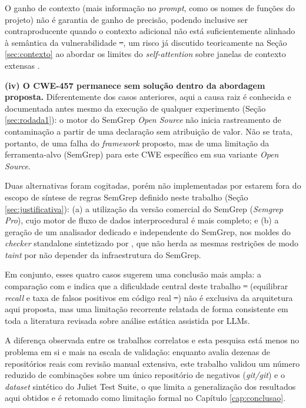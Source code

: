 \documentclass[
    12pt,                %
    openright,           %
    oneside,             %
    a4paper,             %
    english,             %
    brazil               %
]{abntex2}
\newcommand{\antigo}[1]{\sout{#1}}
\newcommand{\novo}[1]{{\color{red}#1}}
\begin{document}
O ganho de contexto (mais informação no \textit{prompt}, como os nomes de funções do projeto) não é garantia de ganho de precisão, podendo inclusive ser contraproducente quando o contexto adicional não está suficientemente alinhado à semântica da vulnerabilidade\antigo{ --}\novo{,} um risco já discutido teoricamente na Seção \ref{sec:contexto} ao abordar os limites do \textit{self-attention} sobre janelas de contexto extensas \cite{vaswani2017attention}.
\par
\textbf{(iv) O CWE-457 permanece sem solução dentro da abordagem proposta.}
Diferentemente dos casos anteriores, aqui a causa raiz é conhecida e documentada antes mesmo da execução de qualquer experimento (Seção \ref{sec:rodada1}): o motor do SemGrep \textit{Open Source} não inicia rastreamento de contaminação a partir de uma declaração sem atribuição de valor.
Não se trata, portanto, de uma falha do \textit{framework} proposto, mas de uma limitação da ferramenta-alvo (SemGrep) para este CWE específico em sua variante \textit{Open Source}.
\par
Duas alternativas foram cogitadas, porém não implementadas por estarem fora do escopo de síntese de regras SemGrep definido neste trabalho (Seção \ref{sec:justificativa}): (a) a utilização da versão comercial do SemGrep (\textit{Semgrep Pro}), cujo motor de fluxo de dados interprocedural é mais completo; e (b) a geração de um analisador dedicado e independente do SemGrep, nos moldes do \textit{checker} standalone sintetizado por , que não herda as mesmas restrições de modo \textit{taint} por não depender da infraestrutura do SemGrep.
\par
Em conjunto, esses quatro casos sugerem uma conclusão mais ampla: a comparação com  e  indica que a dificuldade central deste trabalho\antigo{ --}\novo{ (}equilibrar \textit{recall} e taxa de falsos positivos em código real\antigo{ --}\novo{)} não é exclusiva da arquitetura aqui proposta, mas uma limitação recorrente relatada de forma consistente em toda a literatura revisada sobre análise estática assistida por LLMs.
\par
A diferença observada entre os trabalhos correlatos e esta pesquisa está menos no problema em si e mais na escala de validação: enquanto  avalia dezenas de repositórios reais com revisão manual extensiva, este trabalho validou um número reduzido de combinações sobre um único repositório de negativos (\textit{git/git}) e o \textit{dataset} sintético do Juliet Test Suite, o que limita a generalização dos resultados aqui obtidos e é retomado como limitação formal no Capítulo \ref{cap:conclusao}.
\end{document}

